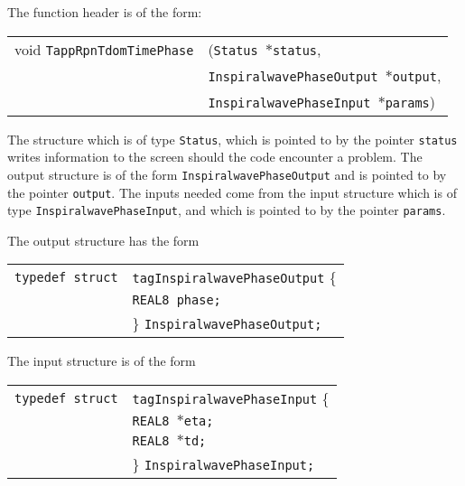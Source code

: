 \documentclass[12pt]{article}
\begin{document}
The function header is of the form:

\vspace{5mm}

\begin{tabular}{ll}
void \texttt{TappRpnTdomTimePhase}&(\texttt{Status $\ast$status},     \\
                                   &\texttt{InspiralwavePhaseOutput $\ast$output}, \\
                                   &\texttt{InspiralwavePhaseInput $\ast$params})
\end{tabular}

\vspace{5mm}

The structure which is of type \texttt{Status}, which is pointed to by the pointer \texttt{status} writes information to the screen should the code encounter a problem. The output structure is of the form \texttt{InspiralwavePhaseOutput} and is pointed to by the pointer \texttt{output}.
The inputs needed come from the input structure which is of type \texttt{InspiralwavePhaseInput}, and which is pointed to by the pointer \texttt{params}.

The output structure has the form

\vspace{5mm}

\begin{tabular}{ll}
\texttt{typedef struct} & \texttt{tagInspiralwavePhaseOutput} \{ \\
                        & \texttt{REAL8 phase;} \\
                        & \} \texttt{InspiralwavePhaseOutput;}
\end{tabular}

\vspace{5mm}

The input structure is of the form

\vspace{5mm}

\begin{tabular}{ll}
\texttt{typedef struct} & \texttt{tagInspiralwavePhaseInput} \{ \\
                        & \texttt{REAL8 $\ast$eta;} \\
                        & \texttt{REAL8 $\ast$td;}  \\
                        & \} \texttt{InspiralwavePhaseInput;}
\end{tabular}

\vspace{5mm}
\end{document}
